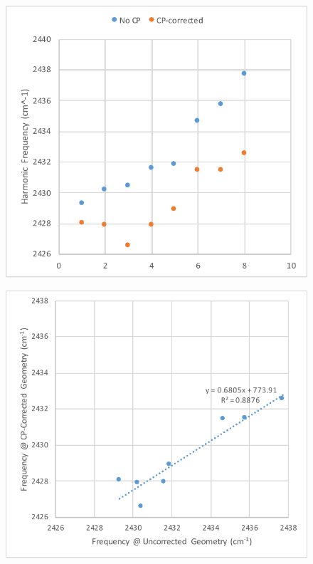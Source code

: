 \documentclass{article}
\begin{document}
\begin{figure}
  \centering
  \includegraphics{./002_2_1.pdf}
\end{figure}

\begin{figure}
  \centering
  \includegraphics{./002_2_2.pdf}
\end{figure}
\end{document}
